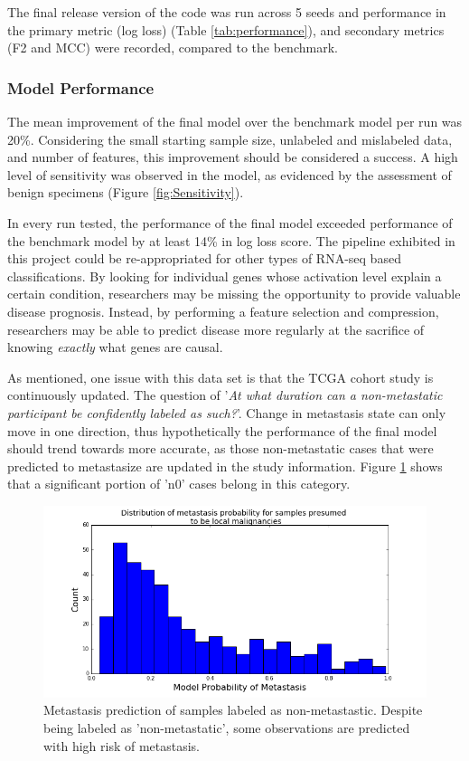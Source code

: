 \documentclass[final]{article}
\begin{document}
The final release version of the code was run across 5 seeds and performance in
the primary metric (log loss) (Table \ref{tab:performance}), and secondary
metrics (F2 and MCC) were recorded, compared to the benchmark.

\subsubsection{Model Performance}

The mean improvement of the final model over the benchmark model per run  was
20\%. Considering the small starting sample size, unlabeled and mislabeled
data, and number of features,  this improvement should be considered a success.
A high level of sensitivity was observed in the model, as evidenced by the assessment
of benign specimens (Figure \ref{fig:Sensitivity}).


In every run tested, the performance of the final model exceeded performance of
the benchmark model by at least 14\% in log loss score.  The pipeline exhibited
in this project could be re-appropriated for other types of RNA-seq based
classifications.  By looking for individual genes whose activation level explain
a certain condition, researchers may be missing the opportunity to provide
valuable disease prognosis.  Instead, by performing a feature selection and
compression, researchers may be able to predict disease more regularly at the
sacrifice of knowing \textit{exactly} what genes are causal.

As mentioned, one issue with this data set is that the TCGA cohort study is continuously updated.
The question of '\textit{At what duration can a non-metastatic participant be confidently
labeled as such?}'.  Change in metastasis state can only move in one direction, thus
hypothetically the performance of the final model should trend towards more accurate, as those
non-metastatic cases that were predicted to metastasize are updated in the study information.  Figure \ref{fig:n0}
shows that a significant portion of 'n0' cases belong in this category.

\begin{figure}
  \centering
  \includegraphics[scale=0.5]{N0Analysis}
  \caption{\label{fig:n0} Metastasis prediction of samples labeled as non-metastastic.
  Despite being labeled as 'non-metastatic', some observations are predicted with high risk of
  metastasis.}
\end{figure}
\end{document}
